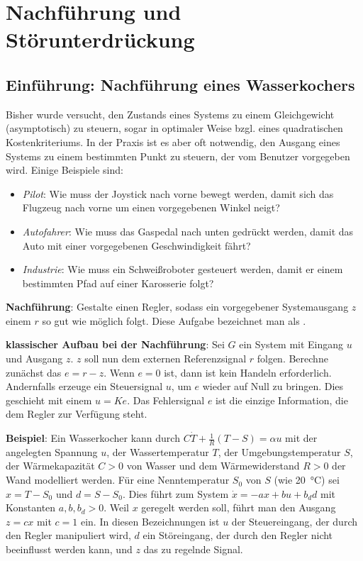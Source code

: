 \chapter{%
    Nachführung und Störunterdrückung%
}

\section{%
    Einführung: Nachführung eines Wasserkochers%
}

Bisher wurde versucht, den Zustands eines Systems zu einem Gleichgewicht (asymptotisch) zu steuern,
sogar in optimaler Weise bzgl. eines quadratischen Kostenkriteriums.
In der Praxis ist es aber oft notwendig, den Ausgang eines Systems zu einem bestimmten Punkt zu
steuern, der vom Benutzer vorgegeben wird.
Einige Beispiele sind:
\begin{itemize}
    \item
    \emph{Pilot}:
    Wie muss der Joystick nach vorne bewegt werden, damit sich das Flugzeug nach vorne um
    einen vorgegebenen Winkel neigt?

    \item
    \emph{Autofahrer}:
    Wie muss das Gaspedal nach unten gedrückt werden, damit das Auto mit einer vorgegebenen
    Geschwindigkeit fährt?

    \item
    \emph{Industrie}:
    Wie muss ein Schweißroboter gesteuert werden, damit er einem bestimmten Pfad auf einer
    Karosserie folgt?
\end{itemize}

\textbf{Nachführung}:
Gestalte einen Regler,
sodass ein vorgegebener Systemausgang $z$ einem  $r$
so gut wie möglich folgt.
Diese Aufgabe bezeichnet man als .

\linie

\textbf{klassischer Aufbau bei der Nachführung}:
Sei $G$ ein System mit Eingang $u$ und Ausgang $z$.
$z$ soll nun dem externen Referenzsignal $r$ folgen.
Berechne zunächst das  $e = r - z$.
Wenn $e = 0$ ist, dann ist kein Handeln erforderlich.
Andernfalls erzeuge ein Steuersignal $u$, um $e$ wieder auf Null zu bringen.
Dies geschieht mit einem  $u = Ke$.
Das Fehlersignal $e$ ist die einzige Information, die dem Regler zur Verfügung steht.

\linie

\textbf{Beispiel}:
Ein Wasserkocher kann durch $C\dot{T} + \frac{1}{R} (T - S) = \alpha u$ mit
der angelegten Spannung $u$,
der Wassertemperatur $T$,
der Umgebungstemperatur $S$,
der Wärmekapazität $C > 0$ von Wasser und
dem Wärmewiderstand $R > 0$ der Wand modelliert werden.
Für eine Nenntemperatur $S_0$ von $S$ (wie \SI{20}{\celsius}) sei $x = T - S_0$ und $d = S - S_0$.
Dies führt zum System $\dot{x} = -ax + bu + b_d d$ mit Konstanten $a, b, b_d > 0$.
Weil $x$ geregelt werden soll, führt man den Ausgang $z = cx$ mit $c = 1$ ein.
In diesen Bezeichnungen ist
$u$ der Steuereingang, der durch den Regler manipuliert wird,
$d$ ein Störeingang, der durch den Regler nicht beeinflusst werden kann, und
$z$ das zu regelnde Signal.

